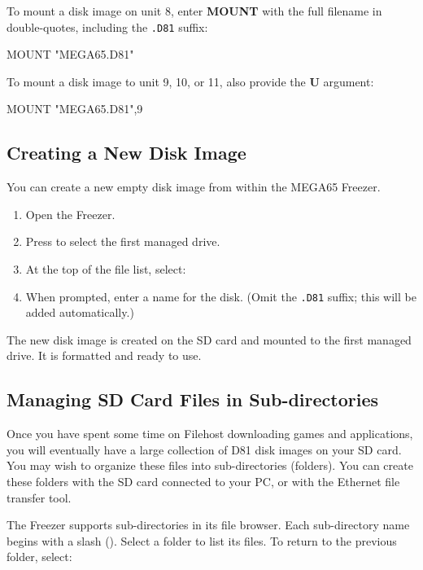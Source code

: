To mount a disk image on unit 8, enter {\bf MOUNT} with the full filename in double-quotes, including the {\tt .D81} suffix:

\begin{screenoutput}
MOUNT "MEGA65.D81"
\end{screenoutput}

To mount a disk image to unit 9, 10, or 11, also provide the {\bf U} argument:

\begin{screenoutput}
MOUNT "MEGA65.D81",9
\end{screenoutput}

\subsection{Creating a New Disk Image}

You can create a new empty disk image from within the MEGA65 Freezer.

\begin{enumerate}
\item Open the Freezer.
\item Press  to select the first managed drive.
\item At the top of the file list, select: 
\item When prompted, enter a name for the disk. (Omit the {\tt .D81} suffix; this will be added automatically.)
\end{enumerate}

The new disk image is created on the SD card and mounted to the first managed drive. It is formatted and ready to use.

\subsection{Managing SD Card Files in Sub-directories}

Once you have spent some time on Filehost downloading games and applications, you will eventually have a large collection of D81 disk images on your SD card. You may wish to organize these files into sub-directories (folders). You can create these folders with the SD card connected to your PC, or with the Ethernet file transfer tool.

The Freezer supports sub-directories in its file browser. Each sub-directory name begins with a slash (\screentext{/}). Select a folder to list its files. To return to the previous folder, select: 

